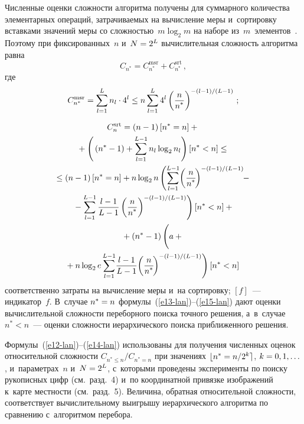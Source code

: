 \begin{multicols}{2}
  Численные оценки сложности алгоритма получены для суммарного 
количества элементарных операций, затрачиваемых на вычисление меры 
и~сортировку вставками значений меры со сложностью~$m\log_2 m$ на наборе 
из~$m$~элементов~\cite{14-lan}. Поэтому при фиксированных~$n$ 
и~$N\hm=2^L$ вычислительная сложность алгоритма равна 
  \begin{equation}
  C_{n^*}= C_{n^*}^{\mathrm{msr}}+C_{n^*}^{\mathrm{srt}}\,,
  \label{e13-lan}
  \end{equation}
где 
\begin{equation}
C_{n^*}^{\mathrm{msr}} =\sum\limits_{l=1}^L n_l\cdot 4^l \leq n
\sum\limits^L_{l=1} 4^l \left( 
\displaystyle\frac{\displaystyle n\mathstrut}{\displaystyle n^*\mathstrut}\right)^{-(l-1)/(L-1)}\,;\label{e14-lan}
\end{equation}

\vspace*{-12pt}

\noindent
\begin{multline}
C_n^{\mathrm{srt}} =(n-1)\left[ n^*=n\right] +{}\\
{}+\left( 
\vphantom{\sum\limits_{l=1}^{L-1}}
\left(
n^*-1\right) +
\sum\limits_{l=1}^{L-1} n_l\log_2n_l\right)\left[ n^*<n\right]\leq{}\\
{}\leq (n-1) \left[ n^*=n\right] +n\log_2 n\left( 
\sum\limits_{l=1}^{L-1}\!\left(\fr{n}{n^*}\!\right)^{-(l-1)/(L-1)}\!\! - {}\right.\\
\left.{}-
\sum\limits_{l=1}^{L-1} \fr{l-1}{L-1}\left( \fr{n}{n^*}\right)^{-(l-1)/(L-1)}\right)
\left[ n^*<n\right]+{}\\
{}+\left(n^*-1\right) \left(
\vphantom{\sum\limits_{l=1}^{L-1}}
 a+{}\right.\\
\hspace*{-3mm}\left.{}+n\log_2 e\sum\limits_{l=1}^{L-1}\! \fr{l-1}{L-1}\! \left( 
\fr{n}{n^*}\!\right)^{-(l-1)/(L-1)}\right) \left[ n^*<n\right]\!\!\!
\label{e15-lan}
\end{multline}
соответственно затраты на вычисление меры и~на сортировку; $[f]$~--- 
индикатор~$f$. В~случае $n^*\hm=n$ формулы~(\ref{e13-lan})--(\ref{e15-lan}) 
дают оценки вычислительной сложности переборного поиска точного решения, 
а~в~случае $n^*<n$~--- оценки сложности иерархического поиска 
приближенного решения. 

  Формулы~(\ref{e12-lan})--(\ref{e14-lan}) использованы для получения 
численных оценок относительной сложности $C_{n^*\leq n}/C_{n^*=n}$ при 
значениях $\lfloor n^*\hm= n/2^k \rceil$, $k\hm=0,1,\ldots$,  и~параметрах~$n$ 
и~$N\hm=2^L$, с~которыми проведены эксперименты по поиску рукописных 
цифр (см.\ разд.~4) и~по координатной привязке изоб\-ра\-же\-ний к~карте местности 
(см.\ разд.~5). Величина, обратная относительной сложности, соответствует 
вычислительному выигрышу иерархического алгоритма по сравнению 
с~алгоритмом перебора.
  

\end{multicols}
